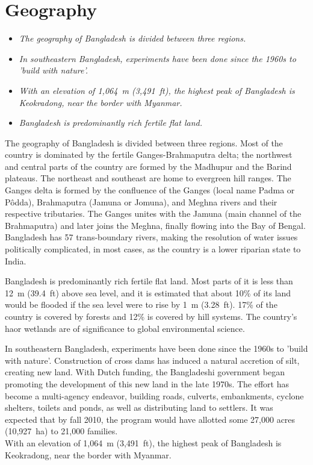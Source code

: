\section{Geography}\label{geography}

\begin{itemize}
\item
  \emph{The geography of Bangladesh is divided between three regions.}
\item
  \emph{In southeastern Bangladesh, experiments have been done since the
  1960s to 'build with nature'.}
\item
  \emph{With an elevation of 1,064~m (3,491~ft), the highest peak of
  Bangladesh is Keokradong, near the border with Myanmar.}
\item
  \emph{Bangladesh is predominantly rich fertile flat land.}
\end{itemize}

The geography of Bangladesh is divided between three regions. Most of
the country is dominated by the fertile Ganges-Brahmaputra delta; the
northwest and central parts of the country are formed by the Madhupur
and the Barind plateaus. The northeast and southeast are home to
evergreen hill ranges. The Ganges delta is formed by the confluence of
the Ganges (local name Padma or Pôdda), Brahmaputra (Jamuna or Jomuna),
and Meghna rivers and their respective tributaries. The Ganges unites
with the Jamuna (main channel of the Brahmaputra) and later joins the
Meghna, finally flowing into the Bay of Bengal. Bangladesh has 57
trans-boundary rivers, making the resolution of water issues politically
complicated, in most cases, as the country is a lower riparian state to
India.

Bangladesh is predominantly rich fertile flat land. Most parts of it is
less than 12~m (39.4~ft) above sea level, and it is estimated that about
10\% of its land would be flooded if the sea level were to rise by 1~m
(3.28~ft). 17\% of the country is covered by forests and 12\% is covered
by hill systems. The country's haor wetlands are of significance to
global environmental science.

In southeastern Bangladesh, experiments have been done since the 1960s
to 'build with nature'. Construction of cross dams has induced a natural
accretion of silt, creating new land. With Dutch funding, the
Bangladeshi government began promoting the development of this new land
in the late 1970s. The effort has become a multi-agency endeavor,
building roads, culverts, embankments, cyclone shelters, toilets and
ponds, as well as distributing land to settlers. It was expected that by
fall 2010, the program would have allotted some 27,000 acres (10,927~ha)
to 21,000 families.\\
With an elevation of 1,064~m (3,491~ft), the highest peak of Bangladesh
is Keokradong, near the border with Myanmar.

